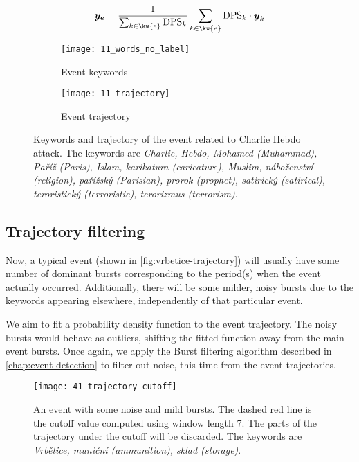 \begin{equation}
	\vect{\traj_{e}} = \frac{1}{\sum_{k \in \kw{e}}{\text{DPS}_{k}}} \sum_{k \in \kw{e}}{\text{DPS}_{k} \cdot \vect{\traj}_{k}}
\end{equation}


\begin{figure}[H]
\centering
\begin{subfigure}{.5\textwidth}
  \centering
  \texttt{[image: 11\_words\_no\_label]}  %
  \caption{Event keywords}
  \label{fig:hebdo-words}
\end{subfigure}%
\begin{subfigure}{.5\textwidth}
  \centering
  \texttt{[image: 11\_trajectory]}  %
  \caption{Event trajectory}
  \label{fig:hebdo-trajectory}
\end{subfigure}
\caption{Keywords and trajectory of the event related to Charlie Hebdo attack. The keywords are \textit{Charlie, Hebdo, Mohamed (Muhammad), Paříž (Paris), Islam, karikatura (caricature), Muslim, náboženství (religion), pařížský (Parisian), prorok (prophet), satirický (satirical), teroristický (terroristic), terorizmus (terrorism)}.}
\end{figure}


\subsection{Trajectory filtering}

Now, a typical event (shown in \autoref{fig:vrbetice-trajectory}) will usually have some number of dominant bursts corresponding to the period(s) when the event actually occurred. Additionally, there will be some milder, noisy bursts due to the keywords appearing elsewhere, independently of that particular event.

We aim to fit a probability density function to the event trajectory. The noisy bursts would behave as outliers, shifting the fitted function away from the main event bursts. Once again, we apply the Burst filtering algorithm described in \autoref{chap:event-detection} to filter out noise, this time from the event trajectories.


\begin{figure}
  \centering
  \texttt{[image: 41\_trajectory\_cutoff]}  %
  \caption{An event with some noise and mild bursts. The dashed red line is the cutoff value computed using window length 7. The parts of the trajectory under the cutoff will be discarded. The keywords are \textit{Vrbětice, muniční (ammunition), sklad (storage)}.}
  \label{fig:vrbetice-trajectory}
\end{figure}


